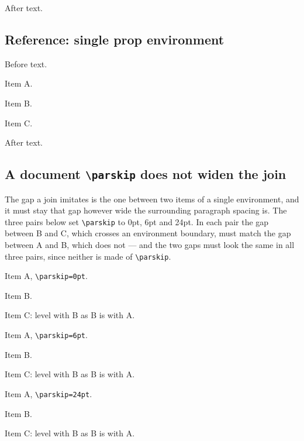 \documentclass{article}
\begin{document}
After text.

\subsection{Reference: single prop environment}

Before text.

\begin{prop}
  \item Item A.
  \item Item B.
  \item Item C.
\end{prop}

After text.

\subsection{A document \texttt{\textbackslash parskip} does not widen the join}

The gap a join imitates is the one between two items of a single environment,
and it must stay that gap however wide the surrounding paragraph spacing is.
The three pairs below set \verb|\parskip| to 0pt, 6pt and 24pt.  In each pair
the gap between B and C, which crosses an environment boundary, must match the
gap between A and B, which does not --- and the two gaps must look the same in
all three pairs, since neither is made of \verb|\parskip|.

\begingroup\setlength{\parskip}{0pt}
\begin{prop}\item Item A, \verb|\parskip=0pt|.\item Item B.\end{prop}
\begin{prop}\item Item C: level with B as B is with A.\end{prop}
\endgroup

\begingroup\setlength{\parskip}{6pt}
\begin{prop}\item Item A, \verb|\parskip=6pt|.\item Item B.\end{prop}
\begin{prop}\item Item C: level with B as B is with A.\end{prop}
\endgroup

\begingroup\setlength{\parskip}{24pt}
\begin{prop}\item Item A, \verb|\parskip=24pt|.\item Item B.\end{prop}
\begin{prop}\item Item C: level with B as B is with A.\end{prop}
\endgroup
\end{document}
